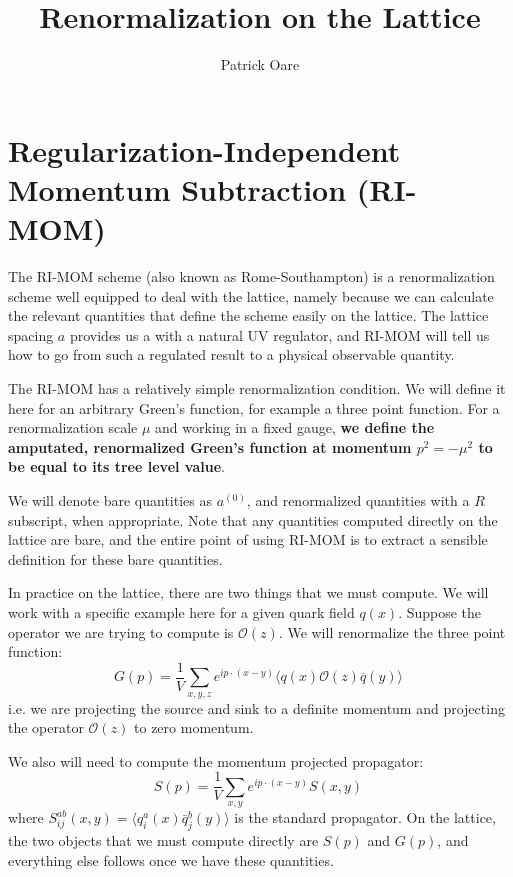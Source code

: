 \documentclass[11pt, oneside]{article}   	%
\title{Renormalization on the Lattice}
\author{Patrick Oare}
\date{}							%
\theoremstyle{definition}
\begin{document}
\maketitle

\section{Regularization-Independent Momentum Subtraction (RI-MOM)}

The RI-MOM scheme (also known as Rome-Southampton) is a renormalization scheme well equipped to deal with 
the lattice, namely because we can calculate the relevant quantities that define the scheme easily on the lattice. The 
lattice spacing $a$ provides us a with a natural UV regulator, and RI-MOM will tell us how to go from such a regulated 
result to a physical observable quantity. 

The RI-MOM has a relatively simple renormalization condition. We will define it here for an arbitrary Green's function, 
for example a three point function. For a renormalization scale $\mu$ and working in a fixed gauge, \textbf{we 
define the amputated, renormalized Green's function at momentum $p^2 = -\mu^2$ to be equal to its tree level 
value}. 

We will denote bare quantities as $a^{(0)}$, and renormalized quantities with a $R$ subscript, when appropriate. 
Note that any quantities computed directly on the lattice are bare, and the entire point of using RI-MOM is to extract 
a sensible definition for these bare quantities. 

In practice on the lattice, there are two things that we must compute. We will work with a specific example here for a 
given quark field $q(x)$. Suppose the operator we are trying to compute is $\mathcal O(z)$. We will renormalize the 
three point function:
\begin{equation}
	G(p) = \frac{1}{V}\sum_{x, y, z}e^{ip\cdot (x - y)}\langle q(x)\mathcal O(z) \overline{q}(y)\rangle~
	\label{eq:green}
\end{equation}
i.e. we are projecting the source and sink to a definite momentum and projecting the operator $\mathcal O(z)$ to zero 
momentum. 

We also will need to compute the momentum projected propagator:
\begin{equation}
	S(p) = \frac{1}{V}\sum_{x, y}e^{ip\cdot(x - y)} S(x, y)~
	\label{eq:mom_prop}
\end{equation}
where $S^{ab}_{ij}(x, y) = \langle q^a_i(x)\bar q^b_j(y)\rangle$ is the standard propagator. On the lattice, the two objects that 
we must compute directly are $S(p)$ and $G(p)$, and everything else follows once we have these quantities. 
\end{document}

